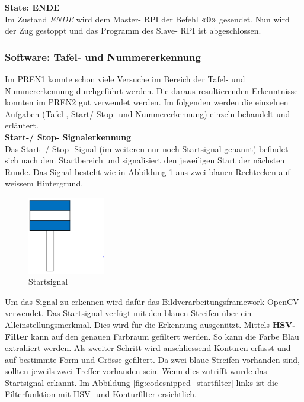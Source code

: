 \documentclass[../../main.tex]{subfiles}
\begin{document}
\textbf{State: ENDE}\\
Im Zustand \textit{ENDE} wird dem Master- RPI der Befehl \textbf{«0»} gesendet. Nun wird der Zug gestoppt und das Programm des Slave- RPI ist abgeschlossen.

\newpage

\subsubsection{Software: Tafel- und Nummererkennung}
Im PREN1 konnte schon viele Versuche im Bereich der Tafel- und Nummererkennung durchgeführt werden. Die daraus resultierenden Erkenntnisse konnten im PREN2 gut verwendet werden. Im folgenden werden die einzelnen Aufgaben (Tafel-, Start/ Stop- und Nummererkennung) einzeln behandelt und erläutert. \\

\textbf{Start-/ Stop- Signalerkennung}\\
Das Start- / Stop- Signal (im weiteren nur noch Startsignal genannt) befindet sich nach dem Startbereich und signalisiert den jeweiligen Start der nächsten Runde. Das Signal besteht wie in Abbildung \ref{fig:startsignal} aus zwei blauen Rechtecken auf weissem Hintergrund.

\begin{figure} %
  \begin{center}
    \includegraphics[width=0.3\textwidth]{startsignal.png}
  \end{center}
  \caption{Startsignal}
  \label{fig:startsignal}
\end{figure}

Um das Signal zu erkennen wird dafür das Bildverarbeitungsframework OpenCV verwendet. Das Startsignal verfügt mit den blauen Streifen über ein Alleinstellungsmerkmal. Dies wird für die Erkennung ausgenützt. Mittels \textbf{HSV- Filter} kann auf den genauen Farbraum gefiltert werden. So kann die Farbe Blau extrahiert werden. Als zweiter Schritt wird anschliessend Konturen erfasst und auf bestimmte Form und Grösse gefiltert. Da zwei blaue Streifen vorhanden sind, sollten jeweils zwei Treffer vorhanden sein. Wenn dies zutrifft wurde das Startsignal erkannt. Im Abbildung \ref{fig:codesnipped_startfilter} links ist die Filterfunktion mit HSV- und Konturfilter ersichtlich.
\end{document}

